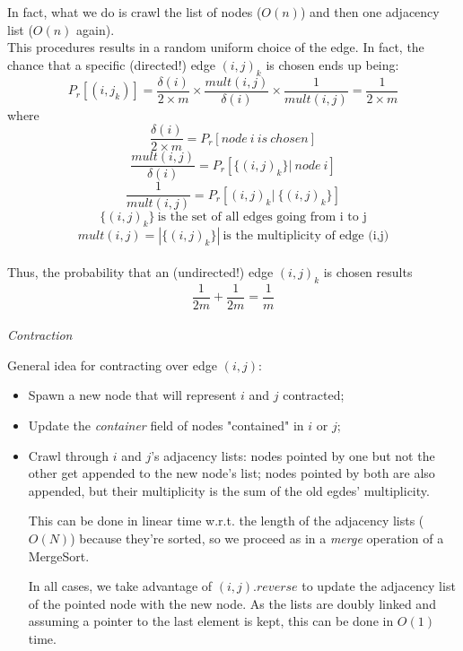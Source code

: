 \documentclass[a4paper]{article}
\begin{document}
In fact, what we do is crawl the list of nodes ($O(n)$) and then one adjacency list ($O(n)$ again).
\\

This procedures results in a random uniform choice of the edge. In fact, the chance that a specific (directed!) edge $(i, j)_k$ is chosen ends up being:
$$P_r[(i,j_k)] = \frac{\delta(i)}{2 \times m} \times \frac{mult(i,j)}{\delta(i)} \times \frac{1}{mult(i,j)} = \frac{1}{2 \times m}$$
where
$$\frac{\delta(i)}{2 \times m} = P_r[node\ i\ is\ chosen]$$
$$\frac{mult(i,j)}{\delta(i)} = P_r[\{(i,j)_k\}|\ node\ i]$$
$$\frac{1}{mult(i,j)} = P_r[(i,j)_k|\ \{(i,j)_k\}]$$
$$\{(i,j)_k\}\ \text{is the set of all edges going from i to j}$$
$$mult(i,j) = |\{(i,j)_k\}|\ \text{is the multiplicity of edge (i,j)}$$
\\

Thus, the probability that an (undirected!) edge $(i,j)_k$ is chosen results
$$\frac{1}{2m} + \frac{1}{2m} = \frac{1}{m}$$
\\
\noindent
\textit{Contraction}

General idea for contracting over edge $(i,j)$:
\begin{itemize}
\item Spawn a new node that will represent $i$ and $j$ contracted;
\item Update the \emph{container} field of nodes "contained" in $i$ or $j$;
\item Crawl through $i$ and $j$'s adjacency lists: nodes pointed by one but not the other get appended to the new node's list; nodes pointed by both are also appended, but their multiplicity is the sum of the old egdes' multiplicity.

This can be done in linear time w.r.t. the length of the adjacency lists ($O(N)$) because they're sorted, so we proceed as in a \emph{merge} operation of a MergeSort.

In all cases, we take advantage of $(i,j).reverse$ to update the adjacency list of the pointed node with the new node. As the lists are doubly linked and assuming a pointer to the last element is kept, this can be done in $O(1)$ time.
\end{itemize}
\end{document}

